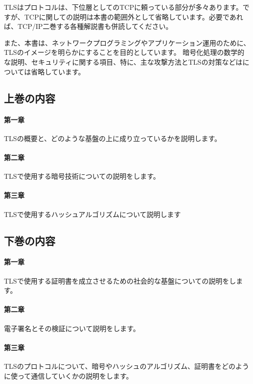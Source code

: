 TLSはプロトコルは、下位層としてのTCPに頼っている部分が多々あります。ですが、TCPに関しての説明は本書の範囲外として省略しています。必要であれば、TCP/IP二巻する各種解説書も併読してください。

また、本書は、ネットワークプログラミングやアプリケーション運用のために、TLSのイメージを明らかにすることを目的としています。
暗号化処理の数学的な説明、セキュリティに関する項目、特に、主な攻撃方法とTLSの対策などはについては省略しています。

\subsection*{上巻の内容}

\paragraph{第一章}
TLSの概要と、どのような基盤の上に成り立っているかを説明します。

\paragraph{第二章}
TLSで使用する暗号技術についての説明をします。

\paragraph{第三章}
TLSで使用するハッシュアルゴリズムについて説明します

\subsection*{下巻の内容}

\paragraph{第一章}
TLSで使用する証明書を成立させるための社会的な基盤についての説明をします。

\paragraph{第二章}
電子署名とその検証について説明をします。

\paragraph{第三章}
TLSのプロトコルについて、暗号やハッシュのアルゴリズム、証明書をどのように使って通信していくかの説明をします。

